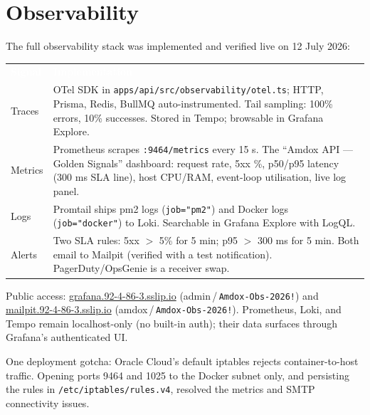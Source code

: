 \documentclass[11pt,a4paper]{article}
\newcommand{\code}[1]{\texttt{\small #1}}
\begin{document}
\section{Observability}\label{sec:observability}

The full observability stack was implemented and verified live on 12 July 2026:

\begin{table}[H]
\centering\small
\renewcommand{\arraystretch}{1.25}
\begin{tabularx}{\textwidth}{l X}
\toprule
\rowcolor{amdoxnavy}
\textcolor{white}{\textbf{Signal}} & \textcolor{white}{\textbf{Implementation}} \\
Traces & OTel SDK in \code{apps/api/src/observability/otel.ts}; HTTP, Prisma, Redis,
  BullMQ auto-instrumented. Tail sampling: 100\% errors, 10\% successes.
  Stored in Tempo; browsable in Grafana Explore. \\
\rowcolor{amdoxlight}
Metrics & Prometheus scrapes \code{:9464/metrics} every 15 s. The
  ``Amdox API --- Golden Signals'' dashboard: request rate, 5xx \%, p50/p95
  latency (300 ms SLA line), host CPU/RAM, event-loop utilisation, live log panel. \\
Logs & Promtail ships pm2 logs (\code{job="pm2"}) and Docker logs
  (\code{job="docker"}) to Loki. Searchable in Grafana Explore with LogQL. \\
\rowcolor{amdoxlight}
Alerts & Two SLA rules: 5xx $>$ 5\% for 5 min; p95 $>$ 300 ms for 5 min.
  Both email to Mailpit (verified with a test notification). PagerDuty/OpsGenie
  is a receiver swap. \\
\bottomrule
\end{tabularx}
\end{table}

\noindent
Public access: \href{https://grafana.92-4-86-3.sslip.io}{grafana.92-4-86-3.sslip.io}
(admin\,/\,\texttt{Amdox-Obs-2026!}) and
\href{https://mailpit.92-4-86-3.sslip.io}{mailpit.92-4-86-3.sslip.io}
(amdox\,/\,\texttt{Amdox-Obs-2026!}).
Prometheus, Loki, and Tempo remain localhost-only (no built-in auth); their data
surfaces through Grafana's authenticated UI.

One deployment gotcha: Oracle Cloud's default iptables rejects container-to-host
traffic. Opening ports 9464 and 1025 to the Docker subnet only, and persisting the
rules in \code{/etc/iptables/rules.v4}, resolved the metrics and SMTP connectivity
issues.
\end{document}

